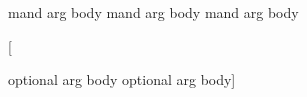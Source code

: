 \mycommand

{

	mand arg body
	mand arg body
	mand arg body}%

[

	optional arg body
	optional arg body]